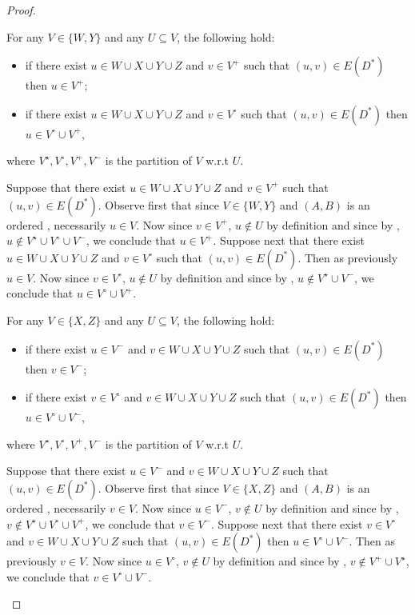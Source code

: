 \begin{proof}
\begin{claim}
\label{clm:W+}
For any $V \in \{W,Y\}$ and any $U \subseteq V$, the following hold:
\begin{itemize}
\item if there exist $u \in W \cup X \cup Y \cup Z$ and $v \in V^+$ such that $(u,v) \in E(D^*)$ then $u \in V^+$;
\item if there exist $u \in W \cup X \cup Y \cup Z$ and $v \in V^\circ$ such that $(u,v) \in E(D^*)$ then $u \in V^\circ \cup V^+$,
\end{itemize}
where $V^\star, V^\circ, V^+,V^-$ is the partition of $V$ w.r.t $U$.
\end{claim}

\begin{claimproof}
Suppose that there exist $u \in W \cup X \cup Y \cup Z$ and $v \in V^+$ such that $(u,v) \in E(D^*)$. Observe first that since $V \in \{W,Y\}$ and $(A,B)$ is an ordered \toughpair, necessarily $u \in V$. Now since $v \in V^+$, $u \notin U$ by definition and since by , $u \notin V^\star \cup V^\circ \cup V^-$, we conclude that $u \in V^+$.
Suppose next that there exist $u \in W \cup X \cup Y \cup Z$ and $v \in V^\circ$ such that $(u,v) \in E(D^*)$. Then as previously $u \in V$. Now since $v \in V^\circ$, $u \notin U$ by definition and since by , $u \notin V^\star \cup V^-$, we conclude that $u \in V^\circ \cup V^+$.
\end{claimproof}

\begin{claim}
\label{clm:X-}
For any $V \in \{X,Z\}$ and any $U \subseteq V$, the following hold:
\begin{itemize}
\item if there exist $u \in V^-$ and $v \in W \cup X \cup Y \cup Z$ such that $(u,v) \in E(D^*)$ then $v \in V^-$;
\item if there exist $v \in V^\circ$ and $v \in W \cup X \cup Y \cup Z$ such that $(u,v) \in E(D^*)$ then $u \in V^\circ \cup V^-$,
\end{itemize}
where $V^\star, V^\circ, V^+,V^-$ is the partition of $V$ w.r.t $U$. 
\end{claim}

\begin{claimproof}
Suppose that there exist $u \in V^-$ and $v \in W \cup X \cup Y \cup Z$ such that $(u,v) \in E(D^*)$. Observe first that since $V \in\{X,Z\}$ and $(A,B)$ is an ordered \toughpair, necessarily $v \in V$. Now since $u \in V^-$, $v \notin U$ by definition and since by , $v \notin V^\star \cup V^\circ \cup V^+$, we conclude that $v \in V^-$.
Suppose next that there exist $v \in V^\circ$ and $v \in W \cup X \cup Y \cup Z$ such that $(u,v) \in E(D^*)$ then $u \in V^\circ \cup V^-$. Then as previously $v \in V$. Now since $u \in V^\circ$,  $v \notin U$ by definition and since by , $v \notin V^+ \cup V^\star$, we conclude that $v \in V^\circ \cup V^-$.
\end{claimproof}


\end{proof}
